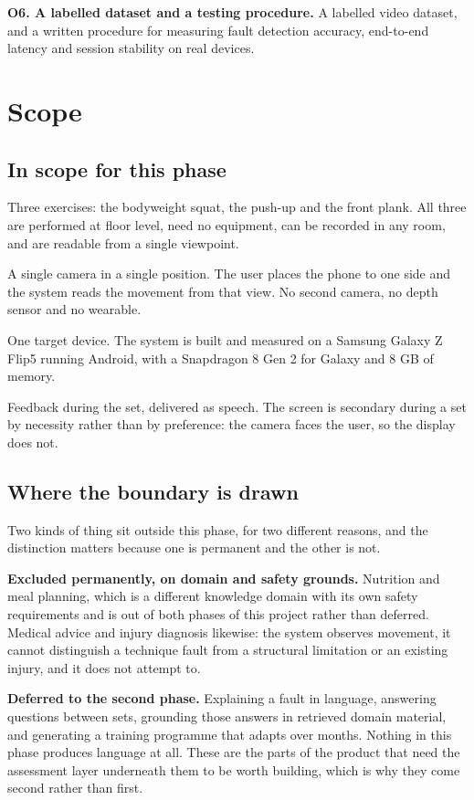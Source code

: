 \textbf{O6. A labelled dataset and a testing procedure.} A labelled video dataset, and a written procedure for measuring fault detection accuracy, end-to-end latency and session stability on real devices.

\section{Scope}
\label{sec:1.4}

\subsection{In scope for this phase}
\label{sec:1.4.1}

Three exercises: the bodyweight squat, the push-up and the front plank. All three are performed at floor level, need no equipment, can be recorded in any room, and are readable from a single viewpoint.

A single camera in a single position. The user places the phone to one side and the system reads the movement from that view. No second camera, no depth sensor and no wearable.

One target device. The system is built and measured on a Samsung Galaxy Z Flip5 running Android, with a Snapdragon 8 Gen 2 for Galaxy and 8 GB of memory.

Feedback during the set, delivered as speech. The screen is secondary during a set by necessity rather than by preference: the camera faces the user, so the display does not.

\subsection{Where the boundary is drawn}
\label{sec:1.4.2}

Two kinds of thing sit outside this phase, for two different reasons, and the distinction matters because one is permanent and the other is not.

\textbf{Excluded permanently, on domain and safety grounds.} Nutrition and meal planning, which is a different knowledge domain with its own safety requirements and is out of both phases of this project rather than deferred. Medical advice and injury diagnosis likewise: the system observes movement, it cannot distinguish a technique fault from a structural limitation or an existing injury, and it does not attempt to.

\textbf{Deferred to the second phase.} Explaining a fault in language, answering questions between sets, grounding those answers in retrieved domain material, and generating a training programme that adapts over months. Nothing in this phase produces language at all. These are the parts of the product that need the assessment layer underneath them to be worth building, which is why they come second rather than first.

